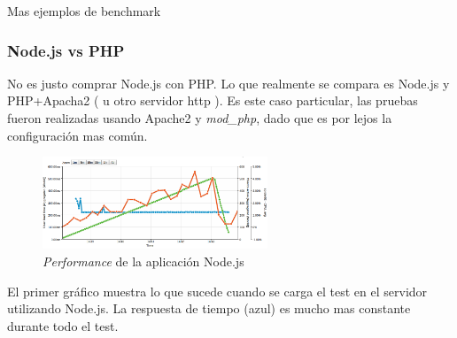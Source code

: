 
Mas ejemplos de benchmark \cite{online_nodejs_java_dzone}


\subsubsection{Node.js vs PHP\cite{online_nodejs_php_loadimpact}}

No es justo comprar Node.js con PHP. Lo que realmente se compara es Node.js y PHP+Apacha2 ( u otro servidor http ). Es este caso particular, las pruebas fueron realizadas usando Apache2 y \textit{mod\_php}, dado que es por lejos la configuración mas común. 





\begin{figure}[h!]
	\centering
	\includegraphics[width=0.6\textwidth]{figuras/cap2/node_benchmak_loadimpact.png}
	\caption{\textit{Performance} de la aplicación Node.js}
	\label{cap2:figure:java_benchmark_paypal}
\end{figure}

El primer gráfico muestra lo que sucede cuando se carga el test en el servidor utilizando Node.js. La respuesta de tiempo (azul) es mucho mas constante durante todo el test. 

